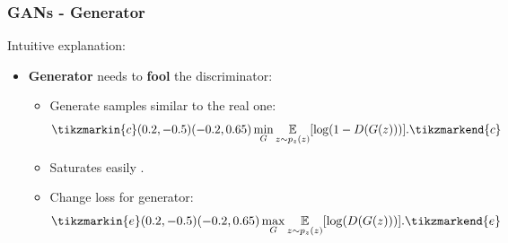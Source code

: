 \documentclass{beamer}
\begin{document}
\begin{frame}
\frametitle{GANs - Generator}
Intuitive explanation:
\begin{itemize}
	\item \textbf{Generator} needs to \textbf{fool} the discriminator:
	\begin{itemize}
		\item Generate samples similar to the real one: \begin{equation} \tikzmarkin{c}(0.2,-0.5)(-0.2,0.65) \min_G  \underset{z \sim p_z(z)}{\mathbb{E}}[\log(1 - D(G(z)))].\tikzmarkend{c}
		\end{equation}
			\item Saturates easily \cite{goodfellowGenerativeAdversarialNetworks2014}.
			\item Change loss for generator:
			\begin{equation} \tikzmarkin{e}(0.2,-0.5)(-0.2,0.65) \max_G  \underset{z \sim p_z(z)}{\mathbb{E}}[\log( D(G(z)))].\tikzmarkend{e}
			\end{equation}
	\end{itemize}
\end{itemize}
\end{frame}
\end{document}
